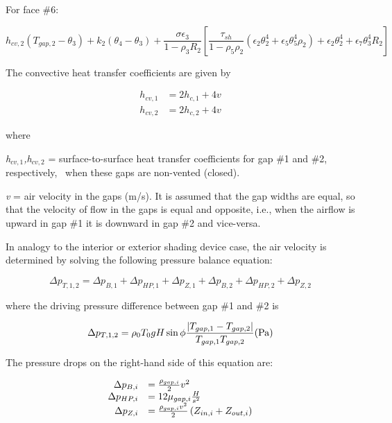 For face \#6:

\begin{equation}
h_{cv,2} (T_{gap,2}-\theta_3) + k_2 (\theta_4-\theta_3) +
    \frac{\sigma \epsilon_3}{1-\rho_3 R_2} \left[
      \frac{\tau_{sh}}{1-\rho_5\rho_2} (
        \epsilon_2 \theta_2^4 + \epsilon_5\theta_5^4\rho_2
      )
      + \epsilon_2\theta_2^4 + \epsilon_7\theta_3^4R_2
    \right]
\end{equation}

The convective heat transfer coefficients are given by

\begin{equation}
  \begin{array}{rl}
    h_{cv,1} &= 2 h_{c,1} + 4v \\
    h_{cv,2} &= 2 h_{c,2} + 4v
  \end{array}
\end{equation}

where

\emph{h\(_{cv,1}\),h\(_{cv,2}\)} = surface-to-surface heat transfer coefficients for gap \#1 and \#2,~ respectively,~ when these gaps are non-vented (closed).

\emph{v} = air velocity in the gaps (m/s). It is assumed that the gap widths are equal, so that the velocity of flow in the gaps is equal and opposite, i.e., when the airflow is upward in gap \#1 it is downward in gap \#2 and vice-versa.

In analogy to the interior or exterior shading device case, the air velocity is determined by solving the following pressure balance equation:

\begin{equation}
\Delta {p_{T,1,2}} = \Delta {p_{B,1}} + \Delta {p_{HP,1}} + \Delta {p_{Z,1}} + \Delta {p_{B,2}} + \Delta {p_{HP,2}} + \Delta {p_{Z,2}}
\end{equation}

where the driving pressure difference between gap \#1 and \#2 is

\begin{equation}
\Delta {p_{T,1,2}} = {\rho_0}{T_0}gH\sin \phi \frac{{\left| {{T_{gap,1}} - {T_{gap,2}}} \right|}}{{{T_{gap,1}}{T_{gap,2}}}}{\rm{      (Pa)}}
\end{equation}

The pressure drops on the right-hand side of this equation are:

\begin{equation}
  \begin{array}{rl}
    \Delta p_{B,i} &= \frac{\rho_{gap,i}}{2} v^2 \\
    \Delta p_{HP,i} &= 12 \mu_{gap,i} \frac{H}{s^2} \\
    \Delta p_{Z,i} &= \frac{\rho_{gap,i} v^2}{2}\PB{Z_{in,i} + Z_{out,i}}
  \end{array}
\end{equation}

